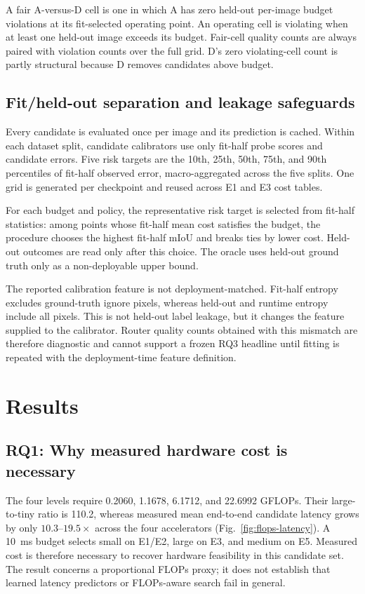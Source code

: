 \documentclass[a4paper,review,12pt]{elsarticle}
\newcommand{\miou}{mIoU}
\begin{document}
A fair A-versus-D cell is one in which A has zero held-out per-image budget violations at its fit-selected operating point. An operating cell is violating when at least one held-out image exceeds its budget. Fair-cell quality counts are always paired with violation counts over the full grid. D's zero violating-cell count is partly structural because D removes candidates above budget.

\subsection{Fit/held-out separation and leakage safeguards}
\label{sec:split}

Every candidate is evaluated once per image and its prediction is cached. Within each dataset split, candidate calibrators use only fit-half probe scores and candidate errors. Five risk targets are the 10th, 25th, 50th, 75th, and 90th percentiles of fit-half observed error, macro-aggregated across the five splits. One grid is generated per checkpoint and reused across E1 and E3 cost tables.

For each budget and policy, the representative risk target is selected from fit-half statistics: among points whose fit-half mean cost satisfies the budget, the procedure chooses the highest fit-half \miou{} and breaks ties by lower cost. Held-out outcomes are read only after this choice. The oracle uses held-out ground truth only as a non-deployable upper bound.

The reported calibration feature is not deployment-matched. Fit-half entropy excludes ground-truth ignore pixels, whereas held-out and runtime entropy include all pixels. This is not held-out label leakage, but it changes the feature supplied to the calibrator. Router quality counts obtained with this mismatch are therefore diagnostic and cannot support a frozen RQ3 headline until fitting is repeated with the deployment-time feature definition.

\section{Results}
\label{sec:results}

\subsection{RQ1: Why measured hardware cost is necessary}

The four levels require 0.2060, 1.1678, 6.1712, and 22.6992 GFLOPs. Their large-to-tiny ratio is 110.2, whereas measured mean end-to-end candidate latency grows by only $10.3$--$19.5\times$ across the four accelerators (Fig.~\ref{fig:flops-latency}). A 10~ms budget selects small on E1/E2, large on E3, and medium on E5. Measured cost is therefore necessary to recover hardware feasibility in this candidate set. The result concerns a proportional FLOPs proxy; it does not establish that learned latency predictors or FLOPs-aware search fail in general.
\end{document}
